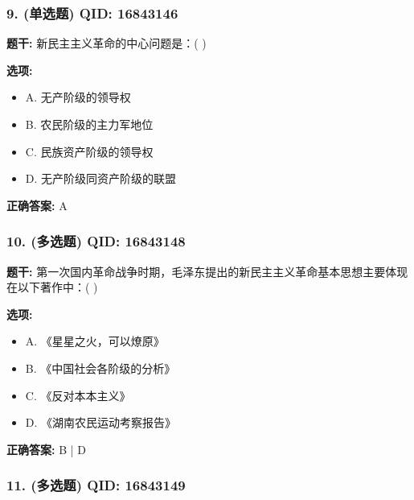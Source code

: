 \documentclass[12pt,UTF8]{ctexart}
\begin{document}
\subsubsection*{9. (单选题) \small QID: 16843146}

\textbf{题干:}
新民主主义革命的中心问题是：( )

\textbf{选项:}
\begin{itemize}[leftmargin=*]

  \item A. 无产阶级的领导权

  \item B. 农民阶级的主力军地位

  \item C. 民族资产阶级的领导权

  \item D. 无产阶级同资产阶级的联盟

\end{itemize}

\textbf{正确答案:}
A

\vspace{0.3em}\hrulefill\vspace{0.7em}

\subsubsection*{10. (多选题) \small QID: 16843148}

\textbf{题干:}
第一次国内革命战争时期，毛泽东提出的新民主主义革命基本思想主要体现在以下著作中：( )

\textbf{选项:}
\begin{itemize}[leftmargin=*]

  \item A. 《星星之火，可以燎原》

  \item B. 《中国社会各阶级的分析》

  \item C. 《反对本本主义》

  \item D. 《湖南农民运动考察报告》

\end{itemize}

\textbf{正确答案:}
B | D

\vspace{0.3em}\hrulefill\vspace{0.7em}

\subsubsection*{11. (多选题) \small QID: 16843149}
\end{document}
